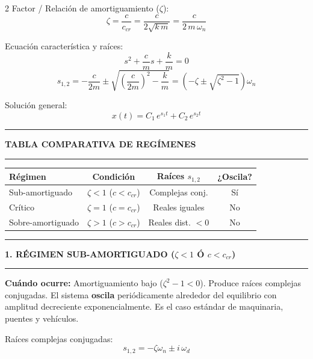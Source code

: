 \documentclass[10pt,a4paper]{article}
\newcommand{\seccion}[1]{%
  \vspace{1.5mm}\hrule\vspace{1mm}%
  \textbf{\footnotesize\MakeUppercase{#1}}\vspace{1mm}\hrule\vspace{1.5mm}}
\begin{document}
\begin{multicols}{2}
Factor / Relación de amortiguamiento ($\zeta$):
\begin{equation*}
  \zeta = \frac{c}{c_{cr}} = \frac{c}{2\sqrt{k\,m}} = \frac{c}{2\,m\,\omega_n}
\end{equation*}

Ecuación característica y raíces:
\begin{equation*}
  s^{2} + \frac{c}{m}s + \frac{k}{m} = 0
\end{equation*}
\begin{equation*}
  s_{1,2} = -\frac{c}{2m} \pm \sqrt{\left(\frac{c}{2m}\right)^{2} - \frac{k}{m}}
          = \left(-\zeta \pm \sqrt{\zeta^{2}-1}\right)\omega_n
\end{equation*}

Solución general:
\begin{equation*}
  x(t) = C_1\,e^{s_1 t} + C_2\,e^{s_2 t}
\end{equation*}

\seccion{Tabla Comparativa de Regímenes}

\begin{center}
\renewcommand{\arraystretch}{1.1}
\footnotesize
\begin{tabular*}{\linewidth}{@{\extracolsep{\fill}}lccc@{}}
\toprule
\textbf{Régimen} & \textbf{Condición} & \textbf{Raíces $s_{1,2}$} & \textbf{¿Oscila?} \\
\midrule
Sub-amortiguado  & $\zeta < 1$ ($c < c_{cr}$) & Complejas conj. & Sí \\
Crítico          & $\zeta = 1$ ($c = c_{cr}$) & Reales iguales  & No \\
Sobre-amortiguado& $\zeta > 1$ ($c > c_{cr}$) & Reales dist. $<0$ & No \\
\bottomrule
\end{tabular*}
\end{center}

\columnbreak

\seccion{1. Régimen Sub-amortiguado ($\zeta < 1$ ó $c < c_{cr}$)}

\textbf{Cuándo ocurre:}
Amortiguamiento bajo ($\zeta^2-1 < 0$). Produce raíces complejas conjugadas. El sistema \textbf{oscila} periódicamente alrededor del equilibrio con amplitud decreciente exponencialmente. Es el caso estándar de maquinaria, puentes y vehículos.

Raíces complejas conjugadas:
\begin{equation*}
  s_{1,2} = -\zeta\omega_n \pm i\,\omega_d
\end{equation*}


\end{multicols}
\end{document}
